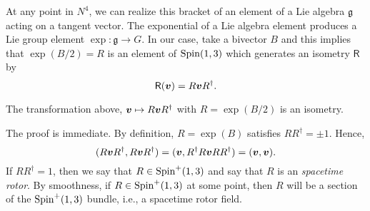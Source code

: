 At any point in $N^4$, we can realize this bracket of an element of a Lie algebra $\mathfrak{g}$ acting on a tangent vector. The exponential of a Lie algebra element produces a Lie group element $\exp \colon \mathfrak{g} \to G$. In our case, take a bivector $B$ and this implies that $\exp \left(B/2\right)=R$ is an element of $\operatorname{Spin}(1,3)$ which generates an isometry $\mathsf{R}$ by
\begin{equation}
    \mathsf{R}(\boldsymbol{v}) = R\boldsymbol{v}R^\dagger.
\end{equation}

\begin{proposition}
The transformation above, $\boldsymbol{v} \mapsto R\boldsymbol{v}R^\dagger$ with $R=\exp\left(B/2\right)$ is an isometry.
\end{proposition}
The proof is immediate. By definition, $R=\exp\left(B\right)$ satisfies $RR^\dagger = \pm 1$. Hence,
\begin{equation}
    (R\boldsymbol{v}R^\dagger,R\boldsymbol{v}R^\dagger) = (\boldsymbol{v},R^\dagger R \boldsymbol{v} RR^\dagger) = (\boldsymbol{v},\boldsymbol{v}).
\end{equation}
If $RR^\dagger = 1$, then we say that $R\in \operatorname{Spin}^+(1,3)$ and say that $R$ is an \emph{spacetime rotor}. By smoothness, if $R\in \operatorname{Spin}^+(1,3)$ at some point, then $R$ will be a section of the $\operatorname{Spin}^+(1,3)$ bundle, i.e., a spacetime rotor field. 

